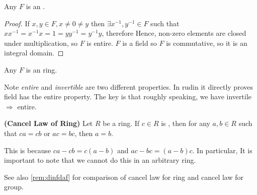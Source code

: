 \documentclass{article}
\newcommand{\bfs}[1]{\textbf{({#1}) }}
\begin{document}
\begin{cora}\label{cora:field_id}
Any  $F$ is an .
\end{cora}
\begin{proof}
If $x, y \in F, x \neq 0 \neq y$ then $\exists x^{-1}, y^{-1} \in F$ such that $x x^{-1}=x^{-1} x=1=y y^{-1}=y^{-1} y$,
therefore  Hence, non-zero elements are closed under multiplication, so $F$ is entire. $F$ is a field so $F$ is commutative, so it is an integral domain.
\end{proof}
\begin{cora}
Any  $F$ is an  ring.
\end{cora}
\begin{rema}\label{rema:can_law}
Note \emph{entire} and \emph{invertible} are two different properties.  In rudin it directly proves field has the entire property. The key is that roughly speaking, we have invertile $\Rightarrow$ entire.

\end{rema}
\begin{cora}{\bfs{Cancel Law of Ring}}\label{cora:ringcan}
Let $R$ be a ring. If $c \in R$ is , then for any $a, b \in R$ such that $c a=c b$ or $a c=b c$, then $a=b$.

This is because $c a-c b=c(a-b)$ and $a c-b c=(a-b) c$. In particular,  It is important to note that we cannot do this in an arbitrary ring.
\end{cora}
\begin{rema}
See also \cref{rem:dinfdaf} for comparison of cancel law for ring and cancel law for group.
\end{rema}
\end{document}
